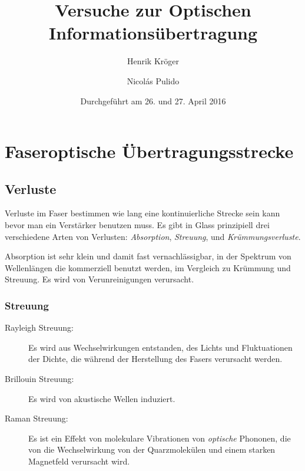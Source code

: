 \documentclass[a4paper]{article}
\title{Versuche zur Optischen Informationsübertragung}
\author{Henrik Kröger \and Nicolás Pulido}
\date{Durchgeführt am 26. und 27. April 2016}
\begin{document}


\maketitle


\tableofcontents

\newpage
\section{Faseroptische Übertragungsstrecke}


\subsection{Verluste}
Verluste im Faser bestimmen wie lang eine kontinuierliche Strecke sein kann
bevor man ein Verstärker benutzen muss. Es gibt in Glass prinzipiell drei verschiedene
Arten von Verlusten: \emph{Absorption}, \emph{Streuung}, und
\emph{Krümmungsverluste}.  

Absorption ist sehr klein und damit fast vernachlässigbar, in der Spektrum von
Wellenlängen die kommerziell benutzt werden, im Vergleich zu Krümmung und
Streuung. Es wird von Verunreinigungen verursacht.

\subsubsection{Streuung}

\begin{description}
  \item[Rayleigh Streuung:] Es wird aus Wechselwirkungen entstanden, des Lichts
    und Fluktuationen der Dichte, die während der Herstellung des Fasers
    verursacht werden. 

  \item[Brillouin Streuung:] Es wird von akustische Wellen induziert. 

  \item[Raman Streuung:] Es ist ein Effekt von molekulare Vibrationen von
    \emph{optische} Phononen, die von die Wechselwirkung von der Quarzmolekülen
    und einem starken Magnetfeld verursacht wird.
\end{description}
\end{document}
